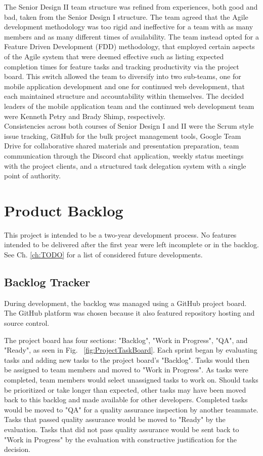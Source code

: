 The Senior Design II team structure was refined from experiences, both good and bad, taken from the Senior Design I structure.  The team agreed that the Agile development methodology was too rigid and ineffective for a team with as many members and as many different times of availability. The team instead opted for a Feature Driven Development (FDD) methodology, that employed certain aspects of the Agile system that were deemed effective such as listing expected completion times for feature tasks and tracking productivity via the project board. This switch allowed the team to diversify into two sub-teams, one for mobile application development and one for continued web development, that each maintained structure and accountability within themselves. The decided leaders of the mobile application team and the continued web development team were Kenneth Petry and Brady Shimp, respectively.\\

Consistencies across both courses of Senior Design I and II were the Scrum style issue tracking, GitHub for the bulk project management tools, Google Team Drive for collaborative shared materials and presentation preparation, team communication through the Discord chat application, weekly status meetings with the project clients, and a structured task delegation system with a single point of authority.


\section{Product Backlog}

This project is intended to be a two-year development process. No features intended to be delivered after the first year were left incomplete or in the backlog. See Ch. \ref{ch:TODO} for a list of considered future developments. 

\subsection{Backlog Tracker}

During development, the backlog was managed using a GitHub project board. The GitHub platform was chosen because it also featured repository hosting and source control. 

The project board has four sections: "Backlog", "Work in Progress", "QA", and "Ready", as seen in Fig. 
~\ref{fig:ProjectTaskBoard}. Each sprint began by evaluating tasks and adding new tasks to the project board's "Backlog". Tasks would then be assigned to team members and moved to "Work in Progress". As tasks were completed, team members would select unassigned tasks to work on. Should tasks be prioritized or take longer than expected, other tasks may have been moved back to this backlog and made available for other developers. Completed tasks would be moved to "QA" for a quality assurance inspection by another teammate. Tasks that passed quality assurance would be moved to "Ready" by the evaluation. Tasks that did not pass quality assurance would be sent back to "Work in Progress" by the evaluation with constructive justification for the decision. 

